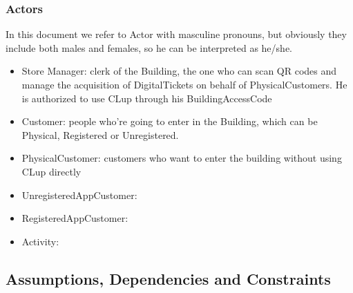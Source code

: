 \documentclass{article}
\begin{document}
	\subsubsection{Actors}
	In this document we refer to Actor with masculine pronouns, but obviously they include both males and females, so he can be interpreted as he/she.
	\begin{itemize}
			\item \textcolor{BrickRed}{Store Manager}: clerk of the Building, the one who can scan QR codes and manage the acquisition of DigitalTickets on behalf of PhysicalCustomers. He is authorized to use CLup through his BuildingAccessCode  
			\item \textcolor{BrickRed}{Customer}: people who're going to enter in the Building, which can be Physical, Registered or Unregistered.
			\item \textcolor{BrickRed}{PhysicalCustomer}: customers who want to enter the building without using CLup directly
			\item \textcolor{BrickRed}{UnregisteredAppCustomer}: 
			\item \textcolor{BrickRed}{RegisteredAppCustomer}: 
			\item \textcolor{BrickRed}{Activity}: 
	\end{itemize}
	
	\subsection{Assumptions, Dependencies and Constraints}
	
\end{document}
